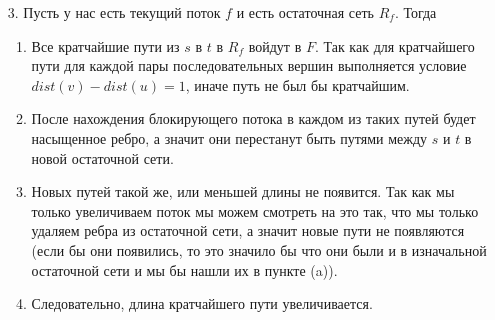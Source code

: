 \documentclass[10pt]{article}
\begin{document}
\begin{enumerate}
	\item[3.] Пусть у нас есть текущий поток $f$ и есть остаточная сеть $R_f$. Тогда
		\begin{enumerate}
			\item Все кратчайшие пути из $s$ в $t$ в $R_f$ войдут в $F$. Так как для кратчайшего пути  для каждой пары последовательных вершин выполняется условие $dist(v) - dist(u) = 1$, иначе путь не был бы кратчайшим.
			\item После нахождения блокирующего потока в каждом из таких путей будет насыщенное ребро, а значит они перестанут быть путями между $s$ и $t$ в новой остаточной сети.
			\item Новых путей такой же, или меньшей длины не появится. Так как мы только увеличиваем поток мы можем смотреть на это так, что мы только удаляем ребра из остаточной сети, а значит новые пути не появляются (если бы они появились, то это значило бы что они были и в изначальной остаточной сети и мы бы нашли их в пункте (a)).
			\item Следовательно, длина кратчайшего пути увеличивается.
		\end{enumerate}
		
\end{enumerate}
\end{document}
